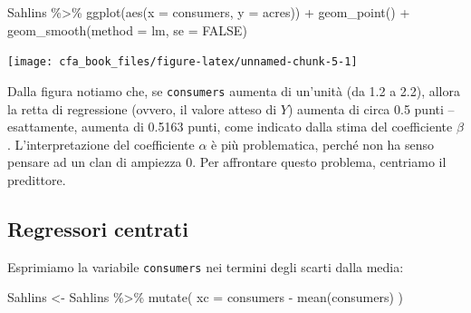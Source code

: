 \documentclass[
  11pt,
]{krantz}
\makeatletter
\newenvironment{Shaded}{\begin{snugshade}}{\end{snugshade}}
\newcommand{\AttributeTok}[1]{\textcolor[rgb]{0.61,0.61,0.61}{#1}}
\newcommand{\CommentTok}[1]{\textcolor[rgb]{0.37,0.37,0.37}{\textit{#1}}}
\newcommand{\ConstantTok}[1]{\textcolor[rgb]{0,0,0}{#1}}
\newcommand{\FunctionTok}[1]{\textcolor[rgb]{0,0,0}{#1}}
\newcommand{\NormalTok}[1]{#1}
\newcommand{\OtherTok}[1]{\textcolor[rgb]{0.37,0.37,0.37}{#1}}
\newcommand{\SpecialCharTok}[1]{\textcolor[rgb]{0,0,0}{#1}}
\newenvironment{kframe}{%
\medskip{}
\setlength{\fboxsep}{.8em}
 \def\at@end@of@kframe{}%
 \ifinner\ifhmode%
  \def\at@end@of@kframe{\end{minipage}}%
  \begin{minipage}{\columnwidth}%
 \fi\fi%
 \def\FrameCommand##1{\hskip\@totalleftmargin \hskip-\fboxsep
 \colorbox{shadecolor}{##1}\hskip-\fboxsep
     \hskip-\linewidth \hskip-\@totalleftmargin \hskip\columnwidth}%
 \MakeFramed {\advance\hsize-\width
   \@totalleftmargin\z@ \linewidth\hsize
   \@setminipage}}%
 {\par\unskip\endMakeFramed%
 \at@end@of@kframe}
\renewenvironment{Shaded}{\begin{kframe}}{\end{kframe}}
\theoremstyle{definition}
\theoremstyle{definition}
\theoremstyle{definition}
\theoremstyle{definition}
\theoremstyle{remark}
\makeatother
\begin{document}
\begin{Shaded}
\begin{Highlighting}[]
\NormalTok{Sahlins }\SpecialCharTok{\%\textgreater{}\%}
  \FunctionTok{ggplot}\NormalTok{(}\FunctionTok{aes}\NormalTok{(}\AttributeTok{x =}\NormalTok{ consumers, }\AttributeTok{y =}\NormalTok{ acres)) }\SpecialCharTok{+}
  \FunctionTok{geom\_point}\NormalTok{() }\SpecialCharTok{+}
  \FunctionTok{geom\_smooth}\NormalTok{(}\AttributeTok{method =}\NormalTok{ lm, }\AttributeTok{se =} \ConstantTok{FALSE}\NormalTok{)}
\end{Highlighting}
\end{Shaded}

\begin{center}\texttt{[image: cfa\_book\_files/figure-latex/unnamed-chunk-5-1]} \end{center}

\begin{Shaded}
\end{Shaded}

Dalla figura notiamo che, se \texttt{consumers} aumenta di un'unità (da 1.2 a 2.2), allora la retta di regressione (ovvero, il valore atteso di \(Y\)) aumenta di circa 0.5 punti -- esattamente, aumenta di 0.5163 punti, come indicato dalla stima del coefficiente \(\beta\). L'interpretazione del coefficiente \(\alpha\) è più problematica, perché non ha senso pensare ad un clan di ampiezza 0. Per affrontare questo problema, centriamo il predittore.

\hypertarget{regressori-centrati}{%
\subsection{Regressori centrati}\label{regressori-centrati}}

Esprimiamo la variabile \texttt{consumers} nei termini degli scarti dalla media:

\begin{Shaded}
\begin{Highlighting}[]
\NormalTok{Sahlins }\OtherTok{\textless{}{-}}\NormalTok{ Sahlins }\SpecialCharTok{\%\textgreater{}\%}
  \FunctionTok{mutate}\NormalTok{(}
    \AttributeTok{xc =}\NormalTok{ consumers }\SpecialCharTok{{-}} \FunctionTok{mean}\NormalTok{(consumers)}
\NormalTok{  )}
\end{Highlighting}
\end{Shaded}
\end{document}
